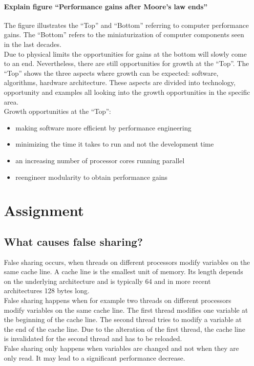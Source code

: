 \documentclass[runningheads]{llncs}
\begin{document}
\paragraph{Explain figure “Performance gains after Moore’s law ends”}
The figure illustrates the “Top” and “Bottom” referring to computer performance gains. 
The “Bottom” refers to the miniaturization of computer components seen in the last decades. \\
Due to physical limits the opportunities for gains at the bottom will slowly come to an end.
 Nevertheless, there are still opportunities for growth at the “Top”. 
 The “Top” shows the three aspects where growth can be expected: software, algorithms, hardware architecture. 
 These aspects are divided into technology, opportunity and examples all looking into the growth opportunities in the specific area.
\\
Growth opportunities at the “Top”:
\begin{itemize}
	\item making software more efficient by performance engineering
	\item minimizing the time it takes to run and not the development time
	\item an increasing number of processor cores running parallel
	\item reengineer modularity to obtain performance gains
\end{itemize}


\section{Assignment}

\subsection{What causes false sharing?}
False sharing occurs, when threads on different processors modify variables on the same cache line. 
A cache line is the smallest unit of memory. Its length depends on the underlying architecture and is typically 64 and 
in more recent architectures 128 bytes long.
\\
False sharing happens when for example two threads on different processors modify variables on the same cache line. 
The first thread modifies one variable at the beginning of the cache line. 
The second thread tries to modify a variable at the end of the cache line. 
Due to the alteration of the first thread, the cache line is invalidated for the second thread and has to be reloaded.
\\
False sharing only happens when variables are changed and not when they are only read. It may lead to a significant performance decrease.
\end{document}

